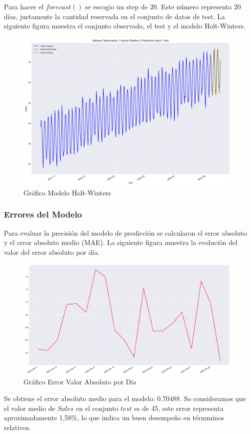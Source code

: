 Para hacer el $forecast()$ se escogio un step de $20$. Este número representa 20 días, justamente la cantidad reservada en el conjunto de datos de test. La siguiente figura muestra el conjunto observado, el test y el modelo Holt-Winters.\begin{figure}[h]
	\centering
	\includegraphics[width=0.7\linewidth]{modelo_holt_wunters}
	\caption{Gráfico Modelo Holt-Winters}
	\label{fig:modeloholtwunters}
\end{figure}

\subsubsection{Errores del Modelo}

Para evaluar la precisión del modelo de predicción se calcularon el error absoluto y el error absoluto medio (MAE). La siguiente figura muestra la evolución del valor del error absoluto por día.
\begin{figure}
	\centering
	\includegraphics[width=0.7\linewidth]{errores_diarios_test_prediccion}
	\caption{Gráfico Error Valor Absoluto por Día}
	\label{fig:erroresdiariostestprediccion}
\end{figure}
	
Se obtiene el error absoluto medio para el modelo: $0.70488$. So consideramos que el valor medio de $Sales$ en el conjunto $test$ es de 45, este error representa aproximadamente 1,58\%, lo que indica un buen desempeño en térmminos relativos.

